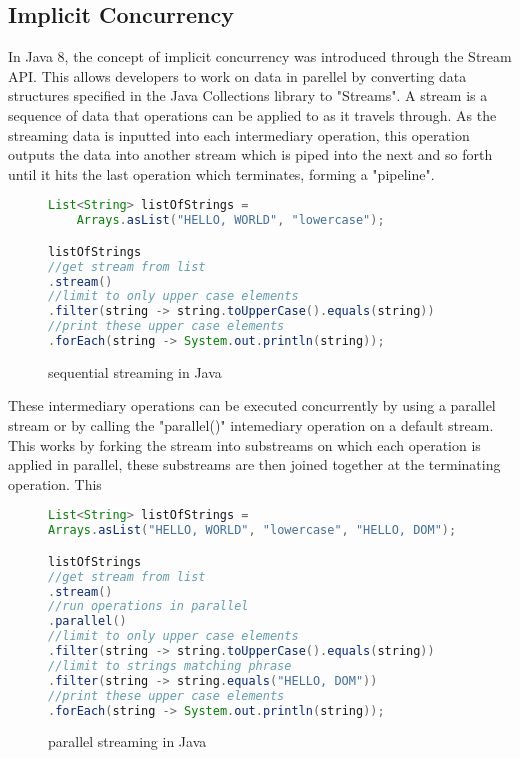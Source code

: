 \documentclass[]{report}
\begin{document}
\subsection{Implicit Concurrency}

In Java 8, the concept of implicit concurrency was introduced through the Stream API. This allows developers to work on data in parellel by converting data structures specified in the Java Collections library to "Streams". A stream is a sequence of data that operations can be applied to as it travels through. As the streaming data is inputted into each intermediary operation, this operation outputs the data into another stream which is piped into the next and so forth until it hits the last operation which terminates, forming a "pipeline". 
\begin{figure}[h!]
\caption{sequential streaming in Java}
\begin{lstlisting}[language=Java,frame=single]
List<String> listOfStrings = 
	Arrays.asList("HELLO, WORLD", "lowercase");

listOfStrings
//get stream from list
.stream()
//limit to only upper case elements
.filter(string -> string.toUpperCase().equals(string))
//print these upper case elements
.forEach(string -> System.out.println(string));
\end{lstlisting}
\end{figure}

These intermediary operations can be executed concurrently by using a parallel stream or by calling the "parallel()" intemediary operation on a default stream. This works by forking the stream into substreams on which each operation is applied in parallel, these substreams are then joined together at the terminating operation. This

\begin{figure}[h!]
\caption{parallel streaming in Java}
\begin{lstlisting}[language=Java,frame=single]
List<String> listOfStrings = 
Arrays.asList("HELLO, WORLD", "lowercase", "HELLO, DOM");

listOfStrings
//get stream from list
.stream()
//run operations in parallel
.parallel()
//limit to only upper case elements
.filter(string -> string.toUpperCase().equals(string))
//limit to strings matching phrase
.filter(string -> string.equals("HELLO, DOM"))
//print these upper case elements
.forEach(string -> System.out.println(string));
\end{lstlisting}
\end{figure}
\end{document}
